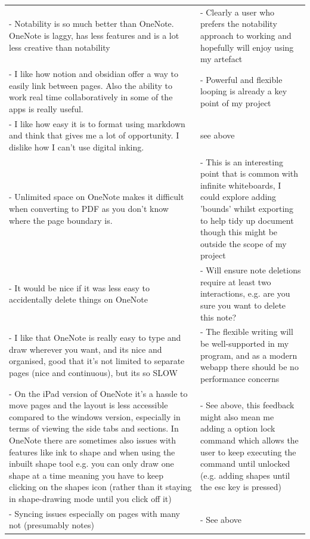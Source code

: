 \begin{longtable}{@{}p{}@{\hspace{1em}}p{}@{}}
- Notability is so much better than OneNote. OneNote is laggy, has less features and is a lot less creative than notability  & 
- Clearly a user who prefers the notability approach to working and hopefully will enjoy using my artefact\\

- I like how notion and obsidian offer a way to easily link between pages. Also the ability to work real time collaboratively in some of the apps is really useful.  & 
- Powerful and flexible looping is already a key point of my project \\ 

- I like how easy it is to format using markdown and think that gives me a lot of opportunity. I dislike how I can't use digital inking.& 
see above \\ 

- Unlimited space on OneNote makes it difficult when converting to PDF as you don't know where the page boundary is. & 
- This is an interesting point that is common with infinite whiteboards, I could explore adding 'bounds' whilst exporting to help tidy up document though this might be outside the scope of my project \\ 

- It would be nice if it was less easy to accidentally delete things on OneNote & 
- Will ensure note deletions require at least two interactions, e.g. are you sure you want to delete this note? \\ 

- I like that OneNote is really easy to type and draw wherever you want, and its nice and organised, good that it's not limited to separate pages (nice and continuous), but its so SLOW &
-  The flexible writing will be well-supported in my program, and as a modern webapp there should be no performance concerns \\ 

- On the iPad version of OneNote it's a hassle to move pages and the layout is less accessible compared to the windows version, especially in terms of viewing the side tabs and sections. In OneNote there are sometimes also issues with features like ink to shape and when using the inbuilt shape tool e.g. you can only draw one shape at a time meaning you have to keep clicking on the shapes icon (rather than it staying in shape-drawing mode until you click off it) & 
- See above, this feedback might also mean me adding a option lock command which allows the user to keep executing the  command until unlocked (e.g. adding shapes until the esc key is pressed) \\

- Syncing issues especially on pages with many not (presumably notes) & 
- See above \\

\bottomrule
\end{longtable}


